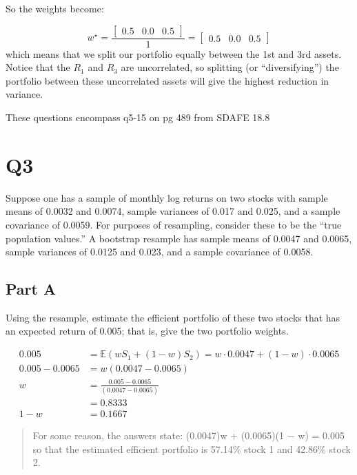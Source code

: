 \documentclass[
  oneside]{book}
\begin{document}
So the weights become:

\[
w^{\star} = \frac{\left[ \begin{array}{ccc}
0.5 & 0.0 & 0.5
\end{array} \right]}{1} = \left[ \begin{array}{ccc}
0.5 & 0.0 & 0.5
\end{array} \right]
\]
which means that we split our portfolio equally between the 1st and 3rd assets. Notice that the \(R_{1}\) and \(R_{3}\) are uncorrelated, so splitting (or ``diversifying'') the portfolio between these uncorrelated assets will give the highest reduction in variance.

These questions encompass q5-15 on pg 489 from SDAFE 18.8

\hypertarget{q3-4}{%
\section{Q3}\label{q3-4}}

Suppose one has a sample of monthly log returns on two stocks with sample means of 0.0032 and 0.0074, sample variances of 0.017 and 0.025, and a sample covariance of 0.0059. For purposes of resampling, consider these to be the ``true population values.'' A bootstrap resample has sample means of 0.0047 and 0.0065, sample variances of 0.0125 and 0.023, and a sample covariance of 0.0058.

\hypertarget{part-a-9}{%
\subsection{Part A}\label{part-a-9}}

Using the resample, estimate the efficient portfolio of these two stocks that has an expected return of 0.005; that is, give the two portfolio weights.

\[
\begin{aligned}
0.005 &= \mathbb{E}(wS_{1}+(1-w)S_{2}) = w\cdot 0.0047 + (1-w) \cdot 0.0065\\
0.005-0.0065&= w(0.0047-0.0065)\\
w &= \frac{0.005-0.0065}{(0.0047-0.0065)}\\
&= 0.8333\\
1-w &= 0.1667
\end{aligned}
\]

\begin{quote}
For some reason, the answers state:
(0.0047)w + (0.0065)(1 − w) = 0.005 so that the estimated efficient portfolio is 57.14\% stock 1 and 42.86\% stock 2.
\end{quote}
\end{document}
